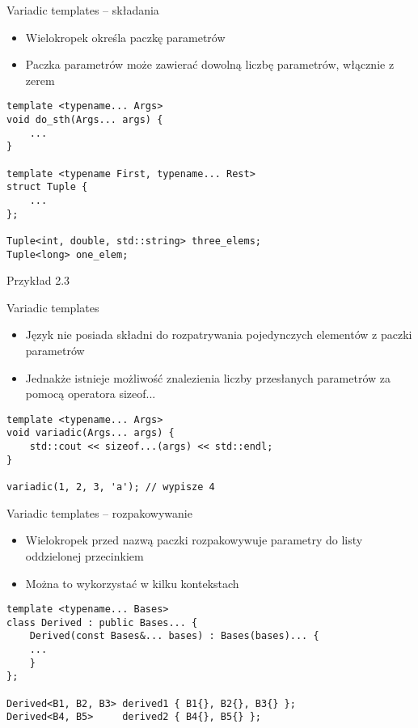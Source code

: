 \documentclass[11pt]{beamer}
\begin{document}
\begin{frame}[fragile]{Variadic templates -- składania}
    \begin{itemize}
        \item Wielokropek określa paczkę parametrów
        \item Paczka parametrów może zawierać dowolną liczbę parametrów, włącznie z zerem
    \end{itemize}
    \begin{lstlisting}[frame=single]
template <typename... Args>
void do_sth(Args... args) {
    ...
}

template <typename First, typename... Rest>
struct Tuple {
    ...
};

Tuple<int, double, std::string> three_elems;
Tuple<long> one_elem;
    \end{lstlisting}
    \alert{Przykład 2.3}
\end{frame}

\begin{frame}[fragile]{Variadic templates}
    \begin{itemize}
        \item Język nie posiada składni do rozpatrywania pojedynczych elementów z paczki parametrów
        \item Jednakże istnieje możliwość znalezienia liczby przesłanych parametrów za pomocą operatora sizeof...
    \end{itemize}
    \begin{lstlisting}[frame=single]
template <typename... Args>
void variadic(Args... args) {
    std::cout << sizeof...(args) << std::endl;
}

variadic(1, 2, 3, 'a'); // wypisze 4
    \end{lstlisting}
\end{frame}

\begin{frame}[fragile]{Variadic templates -- rozpakowywanie}
    \begin{itemize}
        \item Wielokropek przed nazwą paczki rozpakowywuje parametry do listy oddzielonej przecinkiem
        \item Można to wykorzystać w kilku kontekstach
    \end{itemize}
    \begin{lstlisting}[frame=single]
template <typename... Bases>
class Derived : public Bases... {
    Derived(const Bases&... bases) : Bases(bases)... {
    ...
    }
};

Derived<B1, B2, B3> derived1 { B1{}, B2{}, B3{} };
Derived<B4, B5>     derived2 { B4{}, B5{} };
    \end{lstlisting}
\end{frame}
\end{document}

